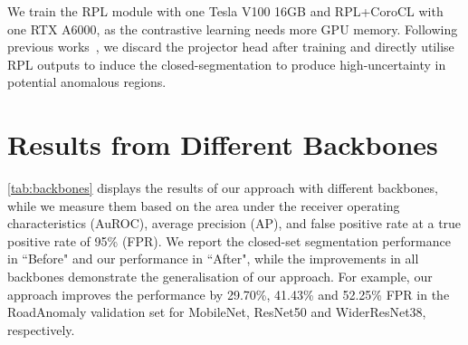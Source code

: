 \documentclass[10pt,twocolumn,letterpaper]{article}
\begin{document}
We train the RPL module with one Tesla V100 16GB and RPL+CoroCL with one RTX A6000, as the contrastive learning needs more GPU memory. Following previous works~\cite{khosla2020supervised, wang2021exploring}, we discard the projector head after training and directly utilise RPL outputs to induce the closed-segmentation to produce high-uncertainty in potential anomalous regions.

\begin{table}[t!]
\caption{\textbf{The impact of the projector architecture} on the SMIYC-Anomaly and RoadAnomaly datasets.}
\vspace{-8 pt}
\label{tab:projector_arch}
\vspace{-10pt}
\end{table}

\section{Results from Different Backbones}
\cref{tab:backbones} displays the results of our approach with different backbones, while we measure them based on the area under the receiver operating characteristics (AuROC), average precision (AP), and false positive rate at a true positive rate of 95\% (FPR). We report the closed-set segmentation performance in ``Before" and our performance in ``After", while the  improvements in all backbones demonstrate the generalisation of our approach. For example, our approach improves the performance by 29.70\%, 41.43\% and 52.25\% FPR in the RoadAnomaly validation set for MobileNet, ResNet50 and WiderResNet38, respectively.
\end{document}
